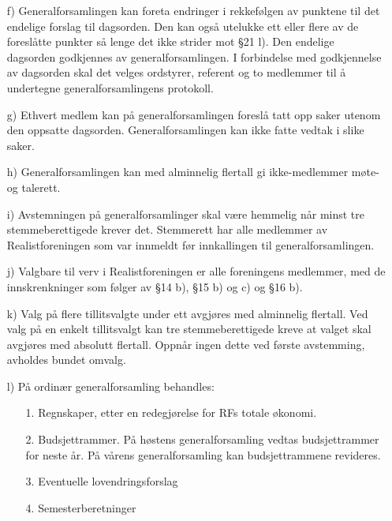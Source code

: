 \begin{itemize}
\item[f)] Generalforsamlingen kan foreta endringer i rekkefølgen av punktene
til det endelige forslag til dagsorden.  Den kan også utelukke ett
eller flere av de foreslåtte punkter så lenge det ikke strider mot
§21 l).  Den endelige dagsorden godkjennes av generalforsamlingen.  I
forbindelse med godkjennelse av dagsorden skal det velges ordstyrer,
referent og to medlemmer til å undertegne generalforsamlingens
protokoll.

\item[g)] Ethvert medlem kan på generalforsamlingen foreslå tatt opp saker
utenom den oppsatte dagsorden. Generalforsamlingen kan ikke fatte
vedtak i slike saker.

\item[h)] Generalforsamlingen kan med alminnelig flertall gi ikke-medlemmer
møte- og talerett.

\item[i)] Avstemningen på generalforsamlinger skal være hemmelig når minst
tre stemmeberettigede krever det.  Stemmerett har alle medlemmer av
Realistforeningen som var innmeldt før innkallingen til
generalforsamlingen.

\item[j)] Valgbare til verv i Realistforeningen er alle foreningens
medlemmer, med de innskrenkninger som følger av §14 b), §15 b) og c) og 
§16 b).

\item[k)] Valg på flere tillitsvalgte under ett avgjøres med alminnelig
flertall.  Ved valg på en enkelt tillitsvalgt kan tre
stemmeberettigede kreve at valget skal avgjøres med absolutt
flertall.  Oppnår ingen dette ved første avstemming, avholdes bundet
omvalg.

\item[l)] På ordinær generalforsamling behandles:

	\begin{itemize}
	\item[1.] Regnskaper, etter en redegjørelse for RFs totale økonomi. 
	
	\item[2.] Budsjettrammer.  På høstens generalforsamling vedtas 
		  budsjettrammer for neste år.  På vårens generalforsamling 
		  kan budsjettrammene revideres.

	\item[3.] Eventuelle lovendringsforslag 

	\item[4.] Semesterberetninger 


\end{itemize}
\end{itemize}
